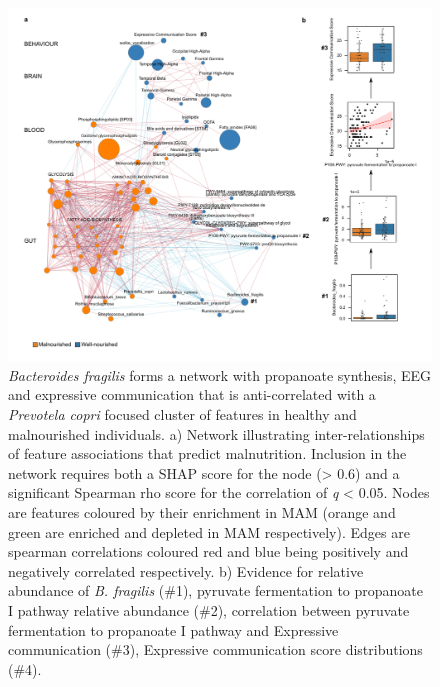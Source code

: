 \documentclass{article}
\begin{document}
\begin{figure}[!htb]
\centering
\includegraphics[scale=0.9]{../../figures/Figure5-network.pdf}
\caption[\textit{Bacteroides fragilis} forms a network with propanoate synthesis, EEG and expressive communication that is anti-correlated with a \textit{P. copri} focused cluster of features in healthy and malnourished individuals]{
	\textit{Bacteroides fragilis} forms a network with propanoate synthesis, EEG and expressive communication that is anti-correlated with a \textit{Prevotela copri} focused cluster of features in healthy and malnourished individuals.
	a) Network illustrating inter-relationships of feature associations that predict malnutrition.
	Inclusion in the network requires both a SHAP score for the node (\textgreater{} 0.6) and a significant Spearman rho score for the correlation of \textit{q} \textless{} 0.05.
	Nodes are features coloured by their enrichment in \gls{MAM} (orange and green are enriched and depleted in \gls{MAM} respectively).
	Edges are spearman correlations coloured red and blue being positively and negatively correlated respectively.
	b) Evidence for relative abundance of \textit{B. fragilis} (\#1), pyruvate fermentation to propanoate I pathway relative abundance (\#2), correlation between pyruvate fermentation to propanoate I pathway and Expressive communication (\#3), Expressive communication score distributions (\#4).}
\label{Figure5}
\end{figure}
\end{document}
